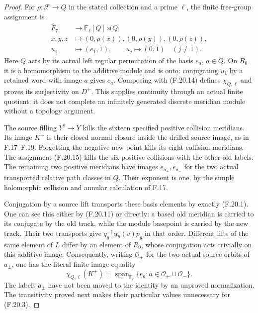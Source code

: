 \begin{proof}
For $\rho:\mathcal F\to Q$ in the stated collection
and a prime $\ell$, the finite free-group assignment is
\[
 \begin{aligned}
 \widehat F_7&\longrightarrow
                    \mathbb F_\ell[Q]\rtimes Q,\\
 x,y,z&\longmapsto(0,\rho(x)),(0,\rho(y)),(0,\rho(z)),\\
 u_1&\longmapsto(e_1,1),\qquad
 u_j\longmapsto(0,1)\quad(j\ne1).
 \end{aligned}                                                \tag{F.20.15}
\]
Here $Q$ acts by its actual left regular permutation
of the basis $e_a$, $a\in Q$.
On $R_0$ it is a homomorphism to the additive module
and is onto: conjugating $u_1$ by a retained word
with image $a$ gives $e_a$.
Composing with (F.20.14) defines $\chi_{Q,\ell}$
and proves its surjectivity on $D^+$.
This supplies continuity through an actual finite
quotient; it does not complete an infinitely generated
discrete meridian module without a topology argument.

The source filling $Y^\dagger\to Y$ kills the sixteen
specified positive collision meridians. Its image
$K^+$ is their closed normal closure inside the
drilled source image, as in F.17--F.19.
Forgetting the negative new point kills its eight
collision meridians. The assignment (F.20.15) kills
the six positive collisions with the other old labels.
The remaining two positive meridians have images
$e_{a_+},e_{a_-}$ for the two actual transported
relative path classes in $Q$.
Their exponent is one, by the simple holomorphic
collision and annular calculation of F.17.

Conjugation by a source lift transports these basis
elements by exactly (F.20.1).
One can see this either by (F.20.11) or directly:
a based old meridian is carried to its conjugate
by the old track, while the module basepoint is
carried by the new track. Their two transports
give $q_g^{-1}\alpha_g(v)p_g$ in that order.
Different lifts of the same element of $L$ differ
by an element of $R_0$, whose conjugation acts
trivially on this additive image.
Consequently, writing $\mathcal O_\pm$ for the
two actual source orbits of $a_\pm$, one has the
literal finite-image equality
\[
 \chi_{Q,\ell}(K^+)
       =\operatorname{span}_{\mathbb F_\ell}
                  \{e_a:a\in\mathcal O_+\cup\mathcal O_-\}.
                                                               \tag{F.20.16}
\]
The labels $a_\pm$ have not been moved to the
identity by an unproved normalization.
The transitivity proved next makes their particular
values unnecessary for (F.20.3).


\end{proof}
